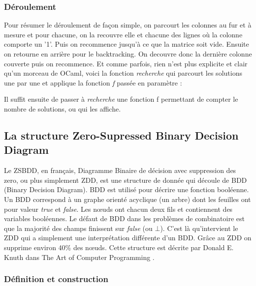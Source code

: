 \documentclass[a4paper]{article}
\begin{document}




\subsubsection{Déroulement}

Pour résumer le déroulement de façon simple, on parcourt les colonnes au fur et
à mesure et pour chacune, on la recouvre elle et chacune 
des lignes 
où la colonne comporte un '1'. Puis on recommence jusqu'à ce que la matrice 
soit vide. Ensuite on retourne en arrière pour le backtracking. On decouvre 
donc la dernière colonne couverte puis on recommence. Et comme parfois, rien n'est plus explicite et clair qu'un morceau de OCaml, 
voici la fonction \emph{recherche} qui parcourt les solutions une par une et 
applique la fonction \emph{f} passée en paramètre :




Il suffit ensuite de passer à \emph{recherche} une fonction f permettant de
compter le nombre de solutions, ou qui les affiche.

\subsection{La structure Zero-Supressed Binary Decision Diagram}



Le ZSBDD, en français, Diagramme Binaire de décision avec suppression des zero, 
ou plus simplement ZDD, est une structure de donnée qui découle de BDD (Binary 
Decision Diagram). BDD est utilisé pour décrire une fonction booléenne. Un
BDD correspond à un graphe orienté acyclique (un arbre) dont les feuilles ont 
pour valeur
\emph{true} et \emph{false}. Les n\oe uds ont chacun deux fils et contiennent 
des variables booléennes. Le défaut de BDD dans les problèmes de combinatoire 
est que la majorité des 
champs finissent sur \emph{false} (ou $\bot$). C'est là qu'intervient le ZDD 
qui a simplement une interprétation différente d'un BDD. Grâce au ZDD on 
supprime environ 40\% des n\oe uds.
Cette structure est décrite par Donald E. Knuth dans 
The Art of Computer Programming \cite[p.249]{taocp4a}.

\subsubsection{Définition et construction}
\end{document}
